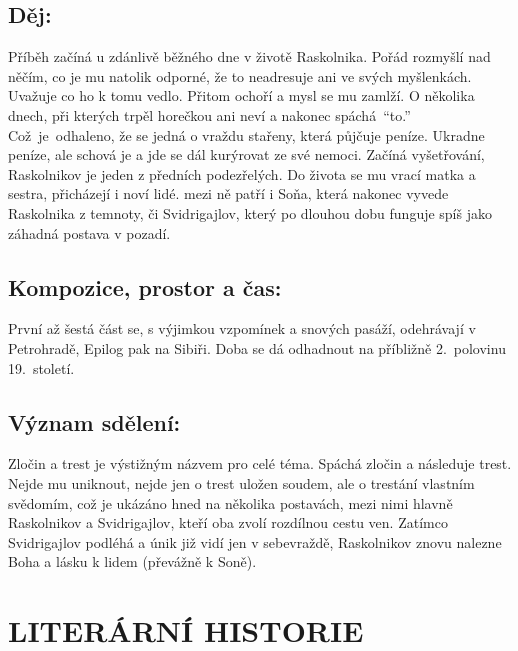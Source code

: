 \documentclass{extarticle} %
\begin{document}
\subsection*{Děj:}
\noindent 
Příběh začíná u zdánlivě běžného dne v životě Raskolnika. Pořád rozmyšlí nad něčím, co je mu natolik odporné, že to neadresuje ani ve svých myšlenkách. Uvažuje co ho k tomu vedlo. Přitom ochoří a mysl se mu zamlží. O několika dnech, při kterých trpěl horečkou ani neví a nakonec spáchá~\enquote{to.} Což~je~odhaleno, že se jedná o vraždu stařeny, která půjčuje peníze. Ukradne peníze, ale schová je a jde se dál kurýrovat ze své nemoci. Začíná vyšetřování, Raskolnikov je jeden z předních podezřelých. Do života se mu vrací matka a sestra, přicházejí i noví lidé. mezi ně patří i Soňa, která nakonec vyvede Raskolnika z temnoty, či Svidrigajlov, který po dlouhou dobu funguje spíš jako záhadná postava v pozadí.

\subsection*{Kompozice, prostor a čas:}
\noindent 
První až šestá část se, s výjimkou vzpomínek a snových pasáží, odehrávají v Petrohradě, Epilog pak na Sibiři. Doba se dá odhadnout na příbližně 2.~polovinu 19.~století.

\subsection*{Význam sdělení:}
\noindent 
Zločin a trest je výstižným názvem pro celé téma. Spáchá zločin a následuje trest. Nejde mu uniknout, nejde jen o trest uložen soudem, ale o trestání vlastním svědomím, což je ukázáno hned na několika postavách, mezi nimi hlavně Raskolnikov a Svidrigajlov, kteří oba zvolí rozdílnou cestu ven. Zatímco Svidrigajlov podléhá a únik již vidí jen v sebevraždě, Raskolnikov znovu nalezne Boha a lásku k lidem (převážně k Soně).

\section*{LITERÁRNÍ HISTORIE}


\end{document}

